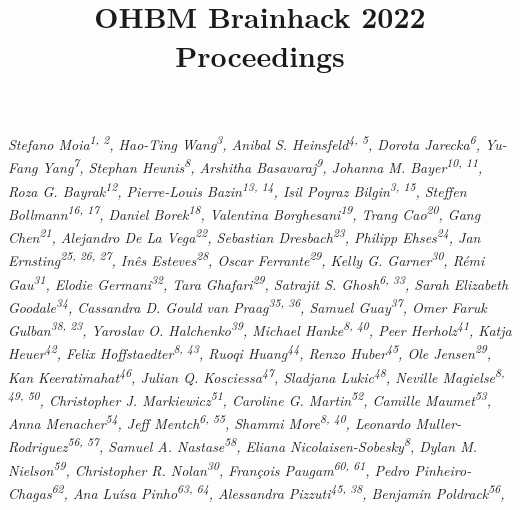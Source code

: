 \documentclass[10pt,a4paper,twocolumns]{proc}
\title{OHBM Brainhack 2022 Proceedings}
\newcommand{\authors}[1]{\emph{\footnotesize #1} \\}
\begin{document}
\maketitle

\authors{Stefano Moia\textsuperscript{1, 2}, %
Hao-Ting Wang\textsuperscript{3}, %
Anibal S. Heinsfeld\textsuperscript{4, 5}, %
Dorota Jarecka\textsuperscript{6}, %
Yu-Fang Yang\textsuperscript{7}, %
Stephan Heunis\textsuperscript{8}, %
Arshitha Basavaraj\textsuperscript{9}, %
Johanna M. Bayer\textsuperscript{10, 11}, %
Roza G. Bayrak\textsuperscript{12}, %
Pierre-Louis Bazin\textsuperscript{13, 14}, %
Isil Poyraz Bilgin\textsuperscript{3, 15}, %
Steffen Bollmann\textsuperscript{16, 17}, %
Daniel Borek\textsuperscript{18}, %
Valentina Borghesani\textsuperscript{19}, %
Trang Cao\textsuperscript{20}, %
Gang Chen\textsuperscript{21}, %
Alejandro De La Vega\textsuperscript{22}, %
Sebastian Dresbach\textsuperscript{23}, %
Philipp Ehses\textsuperscript{24}, %
Jan Ernsting\textsuperscript{25, 26, 27}, %
Inês Esteves\textsuperscript{28}, %
Oscar Ferrante\textsuperscript{29}, %
Kelly G. Garner\textsuperscript{30}, %
Rémi Gau\textsuperscript{31}, %
Elodie Germani\textsuperscript{32}, %
Tara Ghafari\textsuperscript{29}, %
Satrajit S. Ghosh\textsuperscript{6, 33}, %
Sarah Elizabeth Goodale\textsuperscript{34}, %
Cassandra D. Gould van Praag\textsuperscript{35, 36}, %
Samuel Guay\textsuperscript{37}, %
Omer Faruk Gulban\textsuperscript{38, 23}, %
Yaroslav O. Halchenko\textsuperscript{39}, %
Michael Hanke\textsuperscript{8, 40}, %
Peer Herholz\textsuperscript{41}, %
Katja Heuer\textsuperscript{42}, %
Felix Hoffstaedter\textsuperscript{8, 43}, %
Ruoqi Huang\textsuperscript{44}, %
Renzo Huber\textsuperscript{45}, %
Ole Jensen\textsuperscript{29}, %
Kan Keeratimahat\textsuperscript{46}, %
Julian Q. Kosciessa\textsuperscript{47}, %
Sladjana Lukic\textsuperscript{48}, %
Neville Magielse\textsuperscript{8, 49, 50}, %
Christopher J. Markiewicz\textsuperscript{51}, %
Caroline G. Martin\textsuperscript{52}, %
Camille Maumet\textsuperscript{53}, %
Anna Menacher\textsuperscript{54}, %
Jeff Mentch\textsuperscript{6, 55}, %
Shammi More\textsuperscript{8, 40}, %
Leonardo Muller-Rodriguez\textsuperscript{56, 57}, %
Samuel A. Nastase\textsuperscript{58}, %
Eliana Nicolaisen-Sobesky\textsuperscript{8}, %
Dylan M. Nielson\textsuperscript{59}, %
Christopher R. Nolan\textsuperscript{30}, %
François Paugam\textsuperscript{60, 61}, %
Pedro Pinheiro-Chagas\textsuperscript{62}, %
Ana Luísa Pinho\textsuperscript{63, 64}, %
Alessandra Pizzuti\textsuperscript{45, 38}, %
Benjamin Poldrack\textsuperscript{56}, %
}
\end{document}
